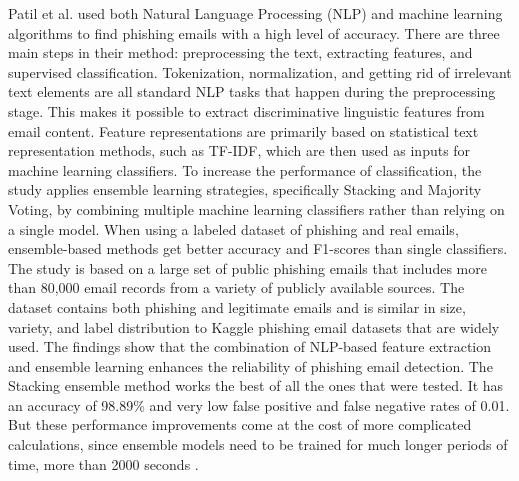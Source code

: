 \documentclass[conference]{IEEEtran}
\begin{document}
Patil et al. used both Natural Language Processing (NLP) and machine learning algorithms to find phishing emails with a high level of accuracy.  There are three main steps in their method: preprocessing the text, extracting features, and supervised classification. Tokenization, normalization, and getting rid of irrelevant text elements are all standard NLP tasks that happen during the preprocessing stage. This makes it possible to extract discriminative linguistic features from email content. Feature representations are primarily based on statistical text representation methods, such as TF-IDF, which are then used as inputs for machine learning classifiers. To increase the performance of classification, the study applies ensemble learning strategies, specifically Stacking and Majority Voting, by combining multiple machine learning classifiers rather than relying on a single model. When using a labeled dataset of phishing and real emails, ensemble-based methods get better accuracy and F1-scores than single classifiers. The study is based on a large set of public phishing emails that includes more than 80,000 email records from a variety of publicly available sources. The dataset contains both phishing and legitimate emails and is similar in size, variety, and label distribution to Kaggle phishing email datasets that are widely used. The findings show that the combination of NLP-based feature extraction and ensemble learning enhances the reliability of phishing email detection. The Stacking ensemble method works the best of all the ones that were tested. It has an accuracy of 98.89\% and very low false positive and false negative rates of 0.01. But these performance improvements come at the cost of more complicated calculations, since ensemble models need to be trained for much longer periods of time, more than 2000 seconds \cite{patil2025integrating}.
\end{document}
